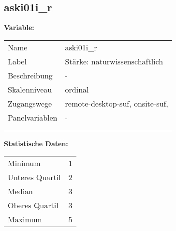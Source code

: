 	
	
	\subsection{aski01i\_r}
	\label{subSection:aski01i_r}

	\noindent\textbf{Variable:}\\
		\begin{tabular}{lL{11.3cm}}
			\label{tableVariable:aski01i_r}
			Name & aski01i\_r \\
			Label & Stärke: naturwissenschaftlich \\
			Beschreibung & - \\
			Skalenniveau & ordinal \\
			Zugangswege &
				remote-desktop-suf,
				onsite-suf,
 \\
			Panelvariablen & -
			 \\
			 \\
 \\
		\end{tabular}



		\vspace*{1 cm}
		\noindent\textbf{Statistische Daten:}\\
			\begin{tabular}{ll}
				\label{tableStatistics:aski01i_r}
					Minimum & 1 \\
					Unteres Quartil & 2 \\
					Median & 3 \\
					Oberes Quartil & 3 \\
					Maximum & 5 \\
			\end{tabular}



